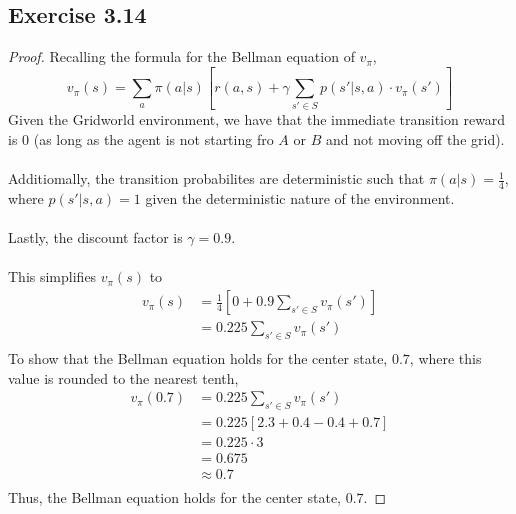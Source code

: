 \documentclass{article}
\begin{document}
\subsection*{Exercise 3.14}
\begin{proof}
    \renewcommand{\qedsymbol}{$\blacksquare$}
        Recalling the formula for the Bellman equation of $v_{\pi}$,
    \begin{equation*}
        v_{\pi}(s) = \sum_{a} \pi(a|s) \left[r(a,s) + \gamma \sum_{s'\in S} p(s'|s,a)\cdot v_{\pi}(s')\right]
    \end{equation*}
    Given the Gridworld environment, we have that the immediate transition reward is $0$ (as long as the agent is not starting fro $A$ or $B$ and not moving off the grid).\\\\
    Additiomally, the transition probabilites are deterministic such that $\pi(a|s)=\frac{1}{4}$, where $p(s'|s,a)=1$ given the deterministic nature of the environment.\\\\
    Lastly, the discount factor is $\gamma=0.9$.\\\\
    This simplifies $v_{\pi}(s)$ to
    \begin{equation*}
        \begin{aligned}
            v_{\pi}(s) &= \frac{1}{4} \left[0 + 0.9 \sum_{s'\in S} v_{\pi}(s')\right]\\
            &= 0.225 \sum_{s'\in S} v_{\pi}(s')\\
        \end{aligned}
    \end{equation*}
    To show that the Bellman equation holds for the center state, $0.7$, where this value is rounded to the nearest tenth,
    \begin{equation*}
        \begin{aligned}
            v_{\pi}(0.7) &= 0.225 \sum_{s'\in S} v_{\pi}(s')\\
            &= 0.225 \left[2.3 + 0.4 - 0.4 + 0.7\right]\\
            &= 0.225 \cdot 3\\
            &= 0.675\\
            &\approx 0.7\\
        \end{aligned}
    \end{equation*}
    Thus, the Bellman equation holds for the center state, $0.7$.\par 
\end{proof}
\end{document}
